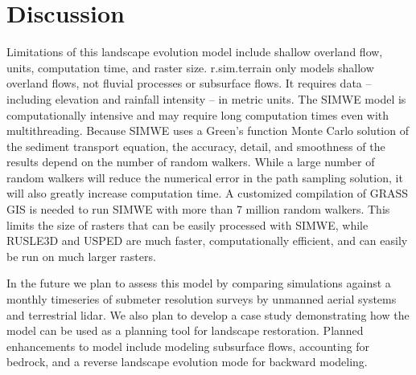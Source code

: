\documentclass[gmd, manuscript]{copernicus}
\begin{document}
\section{Discussion}

Limitations of this landscape evolution model include
shallow overland flow, units, computation time, and raster size.
r.sim.terrain only models shallow overland flows, 
not fluvial processes or subsurface flows.
It requires data -- including 
elevation and rainfall intensity -- in metric units. 
The SIMWE model is computationally intensive 
and may require long computation times even with multithreading.
Because SIMWE uses a Green's function Monte Carlo solution 
of the sediment transport equation, 
the accuracy, detail, and smoothness of the results 
depend on the number of random walkers.
While a large number of random walkers will reduce the
numerical error in the path sampling solution,
it will also greatly increase computation time.
A customized compilation of GRASS GIS 
is needed to run SIMWE with more than 7 million random walkers.
This limits the size of rasters 
that can be easily processed with SIMWE,
while RUSLE3D and USPED are much faster, computationally efficient,
and can easily be run on much larger rasters. 

In the future we plan to assess this model
by comparing simulations against 
a monthly timeseries
of submeter resolution surveys
by unmanned aerial systems and terrestrial lidar. 
We also plan to develop a case study demonstrating
how the model can be used as a planning tool 
for landscape restoration. 
Planned enhancements to model include 
modeling subsurface flows, 
accounting for bedrock, 
and a reverse landscape evolution mode
for backward modeling. 

\conclusions
\end{document}
